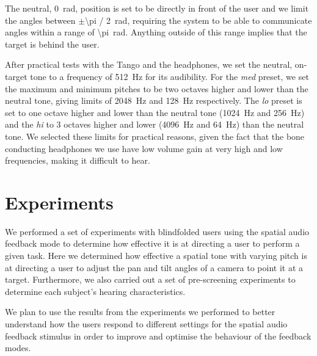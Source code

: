 \documentclass[format=sigconf, review=true, screen=true, anonymous=true]{acmart}
\begin{document}
The neutral, \SI{0}{\radian}, position is set to be directly in front of the user and we limit the angles between $\pm$\SI[quotient-mode=fraction]{\pi / 2}{\radian}, requiring the system to be able to communicate angles within a range of \SI{\pi}{\radian}. Anything outside of this range implies that the target is behind the user.

After practical tests with the Tango and the headphones, we set the neutral, on-target tone to a frequency of \SI{512}{\hertz} for its audibility. For the \emph{med} preset, we set the maximum and minimum pitches to be two octaves higher and lower than the neutral tone, giving limits of \SI{2048}{\hertz} and \SI{128}{\hertz} respectively. The \emph{lo} preset is set to one octave higher and lower than the neutral tone (\SI{1024}{\hertz} and \SI{256}{\hertz}) and the \emph{hi} to 3 octaves higher and lower (\SI{4096}{\hertz} and \SI{64}{\hertz}) than the neutral tone. We selected these limits for practical reasons, given the fact that the bone conducting headphones we use have low volume gain at very high and low frequencies, making it difficult to hear.%


\section{Experiments}
\label{sec:experiments}

We performed a set of experiments with blindfolded users using the spatial audio feedback mode to determine how effective it is at directing a user to perform a given task. Here we determined how effective a spatial tone with varying pitch is at directing a user to adjust the pan and tilt angles of a camera to point it at a target. Furthermore, we also carried out a set of pre-screening experiments to determine each subject's hearing characteristics. %

We plan to use the results from the experiments we performed to better understand how the users respond to different settings for the spatial audio feedback stimulus in order to improve and optimise the behaviour of the feedback modes.
\end{document}
